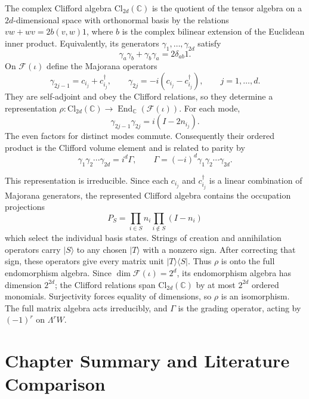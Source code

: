 The complex Clifford algebra $\mathrm{Cl}_{2d}(\mathbb C)$ is the quotient of the tensor algebra on a $2d$-dimensional space with orthonormal basis by the relations $v w+w v=2b(v,w)1$, where $b$ is the complex bilinear extension of the Euclidean inner product. Equivalently, its generators $\gamma_1,\ldots,\gamma_{2d}$ satisfy
\begin{equation}
\gamma_a\gamma_b+\gamma_b\gamma_a=2\delta_{ab}1.
\end{equation}
On $\mathcal F(\iota)$ define the Majorana operators
\begin{equation}
\gamma_{2j-1}=c_{i_j}+c_{i_j}^\dagger,\qquad
\gamma_{2j}=-i(c_{i_j}-c_{i_j}^\dagger),\qquad j=1,\ldots,d.
\end{equation}
They are self-adjoint and obey the Clifford relations, so they determine a representation $\rho:\mathrm{Cl}_{2d}(\mathbb C)\to\operatorname{End}_{\mathbb C}(\mathcal F(\iota))$. For each mode,
\begin{equation}
\gamma_{2j-1}\gamma_{2j}=i(I-2n_{i_j}).
\end{equation}
The even factors for distinct modes commute. Consequently their ordered product is the Clifford volume element and is related to parity by
\begin{equation}
\gamma_1\gamma_2\cdots\gamma_{2d}=i^d\Gamma,
\qquad \Gamma=(-i)^d\gamma_1\gamma_2\cdots\gamma_{2d}.
\end{equation}

This representation is irreducible. Since each $c_{i_j}$ and $c_{i_j}^\dagger$ is a linear combination of Majorana generators, the represented Clifford algebra contains the occupation projections
\begin{equation}
P_S=\prod_{i\in S}n_i\prod_{i\notin S}(I-n_i)
\end{equation}
which select the individual basis states. Strings of creation and annihilation operators carry $|S\rangle$ to any chosen $|T\rangle$ with a nonzero sign. After correcting that sign, these operators give every matrix unit $|T\rangle\langle S|$. Thus $\rho$ is onto the full endomorphism algebra. Since $\dim\mathcal F(\iota)=2^d$, its endomorphism algebra has dimension $2^{2d}$; the Clifford relations span $\mathrm{Cl}_{2d}(\mathbb C)$ by at most $2^{2d}$ ordered monomials. Surjectivity forces equality of dimensions, so $\rho$ is an isomorphism. The full matrix algebra acts irreducibly, and $\Gamma$ is the grading operator, acting by $(-1)^r$ on $\Lambda^r W$.


\section{Chapter Summary and Literature Comparison}

